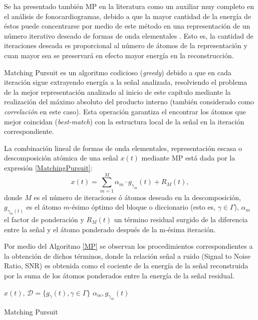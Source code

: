  Se ha presentado también MP en la literatura como un auxiliar muy completo en el análisis de fonocardiogramas, debido a que la mayor cantidad de la energía de éstos puede concentrarse por medio de este método en una representación de un número iterativo deseado de formas de onda elementales \cite[]{Zhang1998a,Zhang1998b,wang04,Sava1998}. Esto es, la cantidad de iteraciones deseada es proporcional al número de átomos de la representación y cuan mayor sea se preservará en efecto mayor energía en la reconstrucción.
 
Matching Pursuit es un algoritmo codicioso (\emph{greedy}) debido a que en cada iteración sigue extrayendo energía a la señal analizada, resolviendo el problema de la mejor representación analizado al inicio de este capítulo mediante la realización del máximo absoluto del producto interno (también considerado como \emph{correlación} en este caso). Esta operación garantiza el encontrar los átomos que mejor coincidan (\emph{best-match}) con la estructura local de la señal en la iteración correspondiente. 

La combinación lineal de formas de onda elementales, representación escasa o descomposición atómica de una señal $x(t)$ mediante MP está dada por la expresión \eqref{MatchingPursuit}:
\begin{equation}\label{MatchingPursuit}
	x(t) = \sum_{m=1}^{M} \alpha_{m} \cdot g_{\gamma_{m}}(t) + R_{M}(t),
\end{equation}
donde $M$ es el número de iteraciones ó átomos deseado en la descomposición, $g_{\gamma_{m}(t)}$ es el átomo $m$-ésimo óptimo del bloque o diccionario (esto es, $\gamma \in \Gamma$), $\alpha_{m}$ el factor de ponderación y $R_{M}(t)$ un término residual surgido de la diferencia entre la señal y el átomo ponderado después de la m-ésima iteración. 

Por medio del Algoritmo \ref{MP} se observan los procedimientos correspondientes a la obtención de dichos términos, donde la relación señal a ruido (Signal to Noise Ratio, SNR) es obtenida como el cociente de la energía de la señal reconstruida por la suma de los átomos ponderados entre la energía de la señal residual.

\begin{algorithm}
\begin{algorithmic}
\REQUIRE $x(t)$, $\mathcal{D}= \{ g_{\gamma}(t), \gamma \in \Gamma \}$
\ENSURE $\alpha_{m}, g_{\gamma_{m}}(t)$
\REPEAT 
\end{algorithmic}
\caption {Matching Pursuit}
\label{MP}
\end{algorithm}

